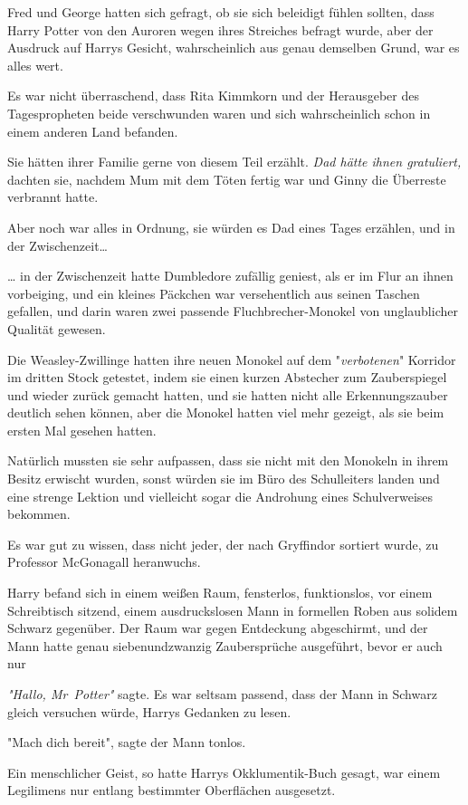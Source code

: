 {Fred und George hatten sich gefragt, ob sie sich beleidigt fühlen sollten, dass Harry Potter von den Auroren wegen ihres Streiches befragt wurde, aber der Ausdruck auf Harrys Gesicht, wahrscheinlich aus genau demselben Grund, war es alles wert.

Es war nicht überraschend, dass Rita Kimmkorn und der Herausgeber des Tagespropheten beide verschwunden waren und sich wahrscheinlich schon in einem anderen Land befanden.

Sie hätten ihrer Familie gerne von diesem Teil erzählt. \emph{Dad hätte ihnen gratuliert,} dachten sie, nachdem Mum mit dem Töten fertig war und Ginny die Überreste verbrannt hatte.

Aber noch war alles in Ordnung, sie würden es Dad eines Tages erzählen, und in der Zwischenzeit…

… in der Zwischenzeit hatte Dumbledore zufällig geniest, als er im Flur an ihnen vorbeiging, und ein kleines Päckchen war versehentlich aus seinen Taschen gefallen, und darin waren zwei passende Fluchbrecher-Monokel von unglaublicher Qualität gewesen.

Die Weasley-Zwillinge hatten ihre neuen Monokel auf dem "\emph{verbotenen}" Korridor im dritten Stock getestet, indem sie einen kurzen Abstecher zum Zauberspiegel und wieder zurück gemacht hatten, und sie hatten nicht alle Erkennungszauber deutlich sehen können, aber die Monokel hatten viel mehr gezeigt, als sie beim ersten Mal gesehen hatten.

Natürlich mussten sie sehr aufpassen, dass sie nicht mit den Monokeln in ihrem Besitz erwischt wurden, sonst würden sie im Büro des Schulleiters landen und eine strenge Lektion und vielleicht sogar die Androhung eines Schulverweises bekommen.

Es war gut zu wissen, dass nicht jeder, der nach Gryffindor sortiert wurde, zu Professor McGonagall heranwuchs.

Harry befand sich in einem weißen Raum, fensterlos, funktionslos, vor einem Schreibtisch sitzend, einem ausdruckslosen Mann in formellen Roben aus solidem Schwarz gegenüber. Der Raum war gegen Entdeckung abgeschirmt, und der Mann hatte genau siebenundzwanzig Zaubersprüche ausgeführt, bevor er auch nur

\emph{"Hallo, Mr~Potter"} sagte. Es war seltsam passend, dass der Mann in Schwarz gleich versuchen würde, Harrys Gedanken zu lesen.

"Mach dich bereit", sagte der Mann tonlos.

Ein menschlicher Geist, so hatte Harrys Okklumentik-Buch gesagt, war einem Legilimens nur entlang bestimmter Oberflächen ausgesetzt.

}
